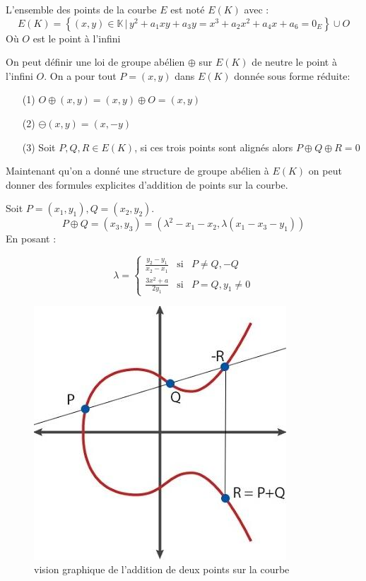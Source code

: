 \documentclass{article}
\begin{document}
\begin{defi}
L'ensemble des points de la courbe $E$ est noté $E(K)$ avec :
\begin{equation*}
E(K) = \left\{ (x,y) \in \mathbb{K} \, | \, y^2 + a_1xy + a_3y  = x^3 + a_2x^2 + a_4x + a_6 = 0_E \right\} \cup {O}
\end{equation*}
Où $O$ est le point à l'infini
\end{defi}


On peut définir une loi de groupe abélien $\oplus$ sur $E(K)$ de neutre le point à l'infini $O$. On a pour tout $P = (x,y) $ dans $E(K)$ donnée sous forme réduite:
\begin{itemize}
\item[(1)] $O \oplus (x,y) = (x,y) \oplus O = (x,y)$
\item[(2)] $\ominus (x,y) = (x, -y)$
\item[(3)] Soit $P,Q,R \in E(K)$, si ces trois points sont alignés alors $P \oplus Q \oplus R = 0$
\end{itemize}

Maintenant qu'on a donné une structure de groupe abélien à $E(K)$ on peut donner des formules explicites d'addition de points sur la courbe.

\begin{prop}
Soit $P =(x_1, y_1), Q=(x_2, y_2)$.
$$P \oplus Q = (x_3, y_3) = (\lambda^2 -x_1 -x_2, \lambda(x_1 - x_3 - y_1)) $$
En posant : 

\begin{equation}
\lambda =
\left\lbrace
\begin{array}{ccc}
\frac{y_2 - y_1}{x_2 - x_1} & \mbox{si} & P \ne Q, -Q  \\
\frac{3x^2 + a}{2y_1} & \mbox{si}  & P = Q, y_1 \ne 0
\end{array}\right.
\end{equation}
\end{prop}
\newpage
\begin{figure}[h!]
\includegraphics[scale=0.7]{pictures/hqdefault.jpg} 
\caption{vision graphique de l'addition de deux points sur la courbe}
\end{figure}
\end{document}
